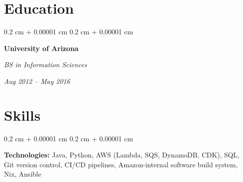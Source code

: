 \documentclass[10pt, letterpaper]{article}
\newenvironment{onecolentry}{
    \begin{adjustwidth}{
        0.2 cm + 0.00001 cm
    }{
        0.2 cm + 0.00001 cm
    }
}{
    \end{adjustwidth}
} %
\newenvironment{twocolentry}[2][]{
    \onecolentry
    \def\secondColumn{#2}
    \setcolumnwidth{\fill, 4.5 cm}
    \begin{paracol}{2}
}{
    \switchcolumn \raggedleft \secondColumn
    \end{paracol}
    \endonecolentry
} %
\begin{document}
    
    \section{Education}



        
        \begin{twocolentry}{
            
            
        \textit{Aug 2012 – May 2016}}
            \textbf{University of Arizona}

            \textit{BS in Information Sciences}
        \end{twocolentry}




    
    \section{Skills}



        
        \begin{onecolentry}
            \textbf{Technologies:} Java, Python, AWS (Lambda, SQS, DynamoDB, CDK), SQL, Git version control, CI/CD pipelines, Amazon-internal software build system, Nix, Ansible
        \end{onecolentry}


    
\end{document}
